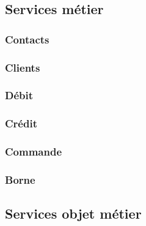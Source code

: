 \subsection{Services métier}
\subsubsection{Contacts}
\subsubsection{Clients}
\subsubsection{Débit}
\subsubsection{Crédit}
\subsubsection{Commande}
\subsubsection{Borne}

\subsection{Services objet métier}

